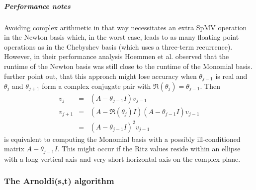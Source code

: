 \documentclass{scrartcl}
\numberwithin{equation}{section}
\begin{document}
\subparagraph{Performance notes}
Avoiding complex arithmetic in that way necessitates an extra SpMV operation in the Newton basis which, in the worst case, leads to as many floating point operations as in the Chebyshev basis (which uses a three-term recurrence). However, in their performance analysis Hoemmen et al. \cite{Hoemmen:2010:CKS:1970638} observed that the runtime of the Newton basis was still close to the runtime of the Monomial basis. \\
\cite{Hoemmen:2010:CKS:1970638} further point out, that this approach might lose accuracy when $\theta_{j - 1}$ is real and $\theta_j$ and $\theta_{j + 1}$ form a complex conjugate pair with $\Re(\theta_j) = \theta_{j - 1} $. Then
\begin{eqnarray*}
v_j &=& (A - \theta_{j - 1} I )v_{j - 1} \\
v_{j + 1} &=& (A - \Re(\theta_j) I )(A - \theta_{j - 1} I )v_{j - 1} \\
		  &=& (A - \theta_{j - 1} I )^2v_{j - 1}
\end{eqnarray*}
is equivalent to computing the Monomial basis with a possibly ill-conditioned  matrix $A - \theta_{j - 1} I$. This might occur if the Ritz values reside within an ellipse with a long vertical axis and very short horizontal axis on the complex plane.

\subsubsection{The Arnoldi(s,t) algorithm}
\end{document}
